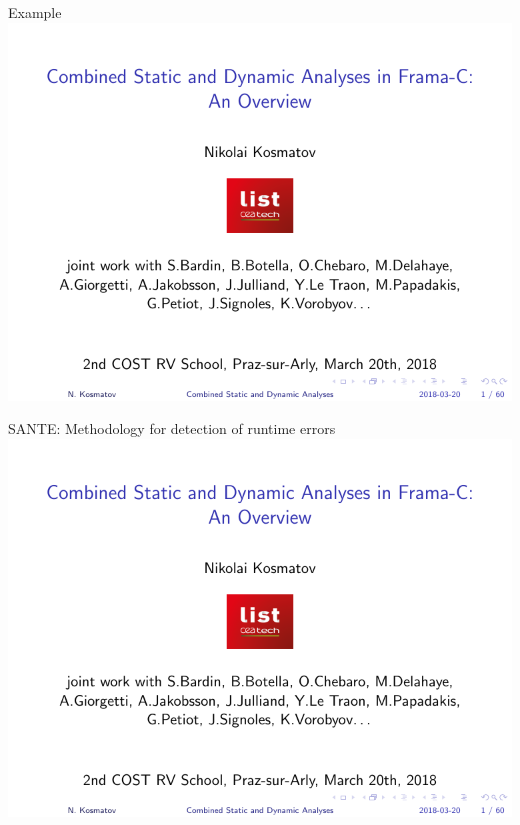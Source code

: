 \begin{frame}{Example}
  \includegraphics[page=50,width=\textwidth,trim={0cm 1cm 0 2cm},clip]{tutorial_2018_03_20_costrv2018.pdf}
\end{frame}


\begin{frame}{SANTE: Methodology for detection of runtime errors}
  \includegraphics[page=51,width=\textwidth,trim={0cm 1cm 0 1.25cm},clip]{tutorial_2018_03_20_costrv2018.pdf}
\end{frame}


